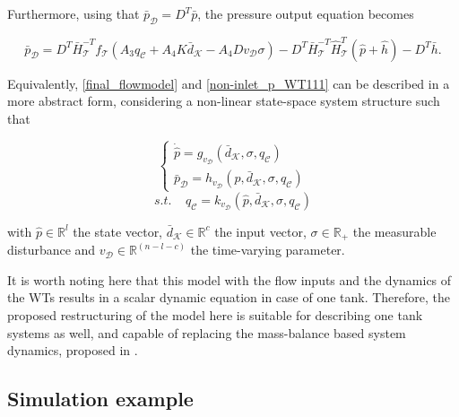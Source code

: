 Furthermore, using that $\bar{p}_{\mathcal{D}} = D^T \bar{p} $, the pressure output equation becomes

\begin{equation}
  \label{non-inlet_p_WT111}
  \bar{p}_{\mathcal{D}} = D^T \bar{H}^{-T}_{\mathcal{T}}f_{\mathcal{T}}(A_3 q_\mathcal{C} + A_4 K \bar{d}_{\mathcal{K}} - A_4 D v_{\mathcal{D}} \sigma) - D^T\bar{H}^{-T}_{\mathcal{T}}\hat{H}^{T}_{\mathcal{T}} (\hat{p} + \hat{h}) - D^T\bar{h} .
\end{equation}

Equivalently, \eqref{final_flowmodel} and \eqref{non-inlet_p_WT111} can be described in a more abstract form, considering a non-linear state-space system structure such that

\begin{equation}
\label{final_flowmodel_abstract}
\begin{cases}
    \dot{\hat{p}} = g_{v_{\mathcal{D}}}( \bar{d}_{\mathcal{K}}, \sigma, q_\mathcal{C})\\
    \bar{p}_{\mathcal{D}} = h_{v_{\mathcal{D}}}(\hat{p}, \bar{d}_{\mathcal{K}}, \sigma, q_\mathcal{C})
\end{cases}
\end{equation}
\begin{equation*}
s.t. \:\:\:\:\: q_\mathcal{C} = k_{v_{\mathcal{D}}}(\hat{p}, \bar{d}_{\mathcal{K}}, \sigma, q_\mathcal{C})
\end{equation*}

with $\hat{p} \in \mathbb{R}^{l}$ the state vector, $\bar{d}_{\mathcal{K}} \in \mathbb{R}^{c}$ the input vector, $\sigma \in \mathbb{R}_{+}$ the measurable disturbance and $v_{\mathcal{D}} \in \mathbb{R}^{(n-l-c)}$ the time-varying parameter. 

It is worth noting here that this model with the flow inputs and the dynamics of the WTs results in a scalar dynamic equation in case of one tank. Therefore, the proposed restructuring of the model here is suitable for describing one tank systems as well, and capable of replacing the mass-balance based system dynamics, proposed in . 


\subsection{Simulation example}
\label{simulation_example2}

